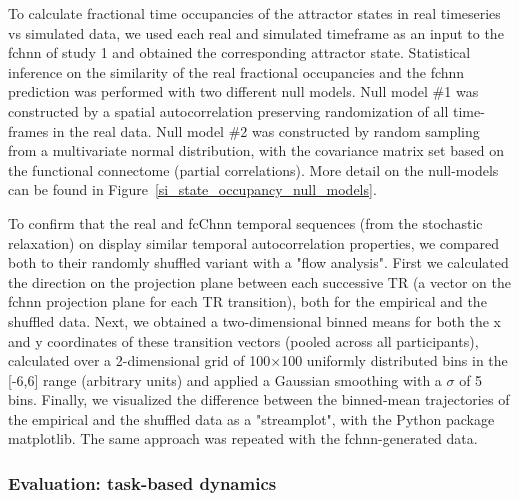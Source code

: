 \documentclass{article}
\begin{document}
To calculate fractional time occupancies of the attractor states in real timeseries vs simulated data, we used each real and simulated timeframe as an input to the \acrshort{fchnn} of study 1 and obtained the corresponding attractor state. Statistical inference on the similarity of the real fractional occupancies and the \acrshort{fchnn} prediction was performed with two different null models. Null model \#1 was constructed by a spatial autocorrelation preserving randomization of all time-frames in the real data. Null model \#2 was constructed  by random sampling from a multivariate normal distribution, with the covariance matrix set based on the functional connectome (partial correlations). More detail on the null-models can be found in Figure~\ref{si_state_occupancy_null_models}.

To confirm that the real and fcC\acrshort{hnn} temporal sequences (from the stochastic relaxation) on display similar temporal autocorrelation properties, we compared both to their randomly shuffled variant with a "flow analysis".
First we calculated the direction on the projection plane between each successive TR (a vector on the \acrshort{fchnn} projection plane for each TR transition), both for the empirical and the shuffled data.
Next, we obtained a two-dimensional binned means for both the x and y coordinates of these transition vectors (pooled across all participants), calculated over a 2-dimensional grid of 100$\times$100 uniformly distributed bins in the [-6,6] range (arbitrary units) and applied a Gaussian smoothing with a $\sigma$ of 5 bins.
Finally, we visualized the difference between the binned-mean trajectories of the empirical and the shuffled data as a "streamplot", with the Python package matplotlib.
The same approach was repeated with the \acrshort{fchnn}-generated data.

\subsubsection{Evaluation: task-based dynamics}
\end{document}

